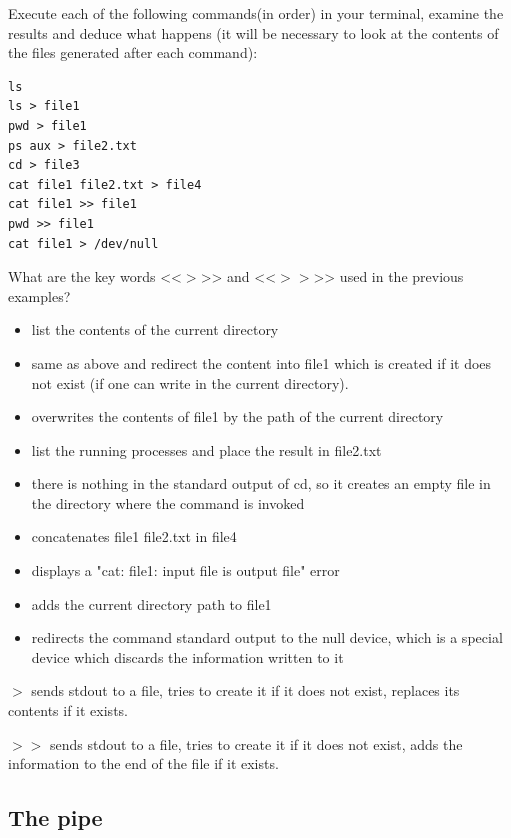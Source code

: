 \documentclass[11pt]{article}
\begin{document}
Execute each of the following commands(in order) in your terminal, examine the results and deduce what happens (it will be necessary to look at the contents of the files generated after each command):


\begin{lstlisting}
ls
ls > file1
pwd > file1
ps aux > file2.txt
cd > file3
cat file1 file2.txt > file4
cat file1 >> file1
pwd >> file1
cat file1 > /dev/null
\end{lstlisting}

What are the key words <<$>$>> and <<$>>$>> used in the previous examples?

\begin{solution}
	\begin{itemize}
		\item list the contents of the current directory
		\item same as above and redirect the content into file1 which is created if it does not exist (if one can write in the current directory).
		\item overwrites the contents of file1 by the path of the current directory
		\item list the running processes and place the result in file2.txt
		\item there is nothing in the standard output of cd, so it creates an empty file in the directory where the command is invoked
		\item concatenates file1 file2.txt in file4
		\item displays a "cat: file1: input file is output file" error
		\item adds the current directory path to file1
		\item redirects the command standard output to the null device, which is a special device which discards the information written to it
		
	\end{itemize}
	
	$> $ sends stdout to a file, tries to create it if it does not exist, replaces its contents if it exists.
	
	$ >> $ sends stdout to a file, tries to create it if it does not exist, adds the information to the end of the file if it exists.
	
\end{solution}

\subsection{The pipe}
\end{document}
